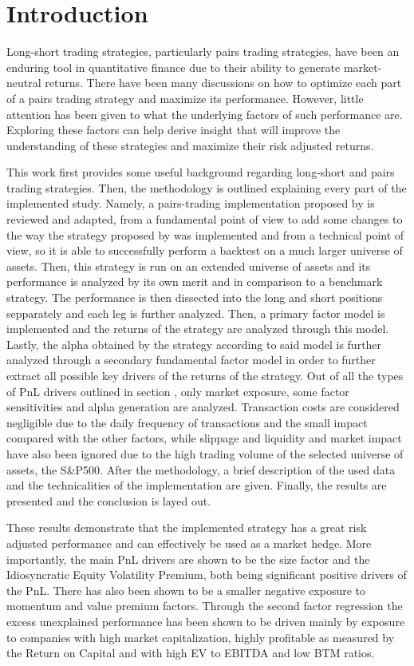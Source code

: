 \section{Introduction}
Long-short trading strategies, particularly pairs trading strategies, have been an enduring tool in quantitative finance due to their ability to generate market-neutral returns. There have been many discussions on how to optimize each part of a pairs trading strategy and maximize its performance. However, little attention has been given to what the underlying factors of such performance are. Exploring these factors can help derive insight that will improve the understanding of these strategies and maximize their risk adjusted returns. 

This work first provides some useful background regarding long-short and pairs trading strategies. Then, the methodology is outlined explaining every part of the implemented study. 
Namely, a pairs-trading implementation proposed by \cite{gallego_2023} is reviewed and adapted, from a fundamental point of view to add some changes to the way the strategy proposed by \cite{ioannis_2023} was implemented and from a technical point of view, so it is able to successfully perform a backtest on a much larger universe of assets. Then, this strategy is run on an extended universe of assets and its performance is analyzed by its own merit and in comparison to a benchmark strategy. The performance is then dissected into the long and short positions sepparately and each leg is further analyzed. 
Then, a primary factor model is implemented and the returns of the strategy are analyzed through this model.  
Lastly, the alpha obtained by the strategy according to said model is further analyzed through a secondary fundamental factor model in order to further extract all possible key drivers of the returns of the strategy. 
Out of all the types of PnL drivers outlined in section , only market exposure, some factor sensitivities and alpha generation are analyzed. Transaction costs are considered negligible due to the daily frequency of transactions and the small impact compared with the other factors, while slippage and liquidity and market impact have also been ignored due to the high trading volume of the selected universe of assets, the S\&P500. 
After the methodology, a brief description of the used data and the technicalities of the implementation are given. Finally, the results are presented and the conclusion is layed out. 

These results demonstrate that the implemented strategy has a great risk adjusted performance and can effectively be used as a market hedge. More importantly, the main PnL drivers are shown to be the size factor and the Idiosyncratic Equity Volatility Premium, both being significant positive drivers of the PnL. There has also been shown to be a smaller negative exposure to momentum and value premium factors. Through the second factor regression the excess unexplained performance has been shown to be driven mainly by exposure to companies with high market capitalization, highly profitable as measured by the Return on Capital and with high EV to EBITDA and low BTM ratios.